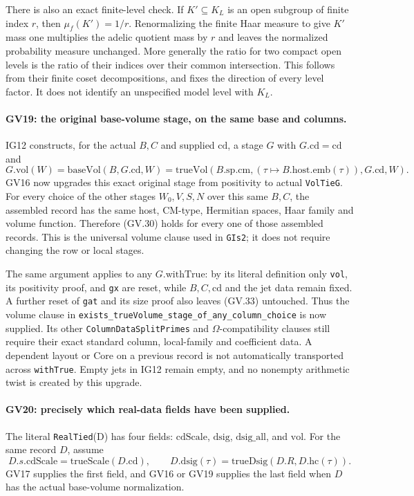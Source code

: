 There is also an exact finite-level check. If $K'\subseteq K_L$
is an open subgroup of finite index $r$, then
$\mu_f(K')=1/r$. Renormalizing the finite Haar measure to give
$K'$ mass one multiplies the adelic quotient mass by $r$ and leaves
the normalized probability measure unchanged. More generally the
ratio for two compact open levels is the ratio of their indices
over their common intersection. This follows from their finite
coset decompositions, and fixes the direction of every level factor.
It does not identify an unspecified model level with $K_L$.

\paragraph{GV19: the original base-volume stage, on the same base and columns.}
IG12 constructs, for the actual $B,C$ and supplied
$\mathrm{cd}$, a stage $G$ with $G.\mathrm{cd}=\mathrm{cd}$ and
\[
 G.\mathrm{vol}(W)=\mathrm{baseVol}(B,G.\mathrm{cd},W)
  =\mathrm{trueVol}(B.\mathrm{sp.cm},
          (\tau\mapsto B.\mathrm{host.emb}(\tau)),G.\mathrm{cd},W).
 \tag{GV.33}
\]
GV16 now upgrades this exact original stage from positivity to
actual \texttt{VolTieG}. For every choice of the other stages
$W_0,V,S,N$ over this same $B,C$, the assembled record has the
same host, CM-type, Hermitian spaces, Haar family and volume
function. Therefore (GV.30) holds for every one of those assembled
records. This is the universal volume clause used in
\texttt{GIs2}; it does not require changing the row or local stages.

The same argument applies to any $G.\mathrm{withTrue}$: by its
literal definition only \texttt{vol}, its positivity proof, and
\texttt{gx} are reset, while $B,C,\mathrm{cd}$ and the jet data
remain fixed. A further reset of \texttt{gat} and its size proof
also leaves (GV.33) untouched. Thus the volume clause in
\texttt{exists\_trueVolume\_stage\_of\_any\_column\_choice} is
now supplied. Its other \texttt{ColumnDataSplitPrimes} and
$\Omega$-compatibility clauses still require their exact standard
column, local-family and coefficient data. A dependent layout or
Core on a previous record is not automatically transported across
\texttt{withTrue}. Empty jets in IG12 remain empty, and no nonempty
arithmetic twist is created by this upgrade.

\paragraph{GV20: precisely which real-data fields have been supplied.}
The literal \texttt{RealTied}(D) has four fields:
$\mathrm{cdScale}$, $\mathrm{dsig}$, $\mathrm{dsig\_all}$,
and $\mathrm{vol}$. For the same record $D$, assume
\[
 D.s.\mathrm{cdScale}=\mathrm{trueScale}(D.\mathrm{cd}),\qquad
 D.\mathrm{dsig}(\tau)=\mathrm{trueDsig}(D.R,D.\mathrm{hc}(\tau)).
 \tag{GV.34}
\]
GV17 supplies the first field, and GV16 or GV19 supplies the last
field when $D$ has the actual base-volume normalization.

